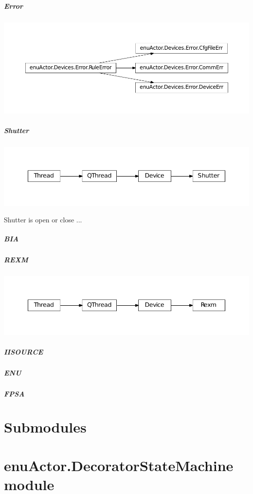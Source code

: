 \documentclass[letterpaper,10pt,english]{sphinxmanual}
\begin{document}
\subparagraph{Error}
\label{enuActor.Devices:error}
\includegraphics{inheritance-a934816c9f8b411a63067bc85b1ddf5dfcadc0b3.pdf}


\subparagraph{Shutter}
\label{enuActor.Devices:shutter}
\includegraphics{inheritance-d3a48ebd57a6a6a4c1aee59224110dc9c5ab3113.pdf}

Shutter is open or close ...


\subparagraph{BIA}
\label{enuActor.Devices:bia}

\subparagraph{REXM}
\label{enuActor.Devices:rexm}
\includegraphics{inheritance-0a1a7ed4280ef7d9af164129c6e9afc50fd1ef14.pdf}


\subparagraph{IISOURCE}
\label{enuActor.Devices:iisource}

\subparagraph{ENU}
\label{enuActor.Devices:enu}

\subparagraph{FPSA}
\label{enuActor.Devices:fpsa}

\section{Submodules}
\label{enuActor:submodules}

\section{enuActor.DecoratorStateMachine module}
\label{enuActor:enuactor-decoratorstatemachine-module}\label{enuActor:module-enuActor.DecoratorStateMachine}
\end{document}
